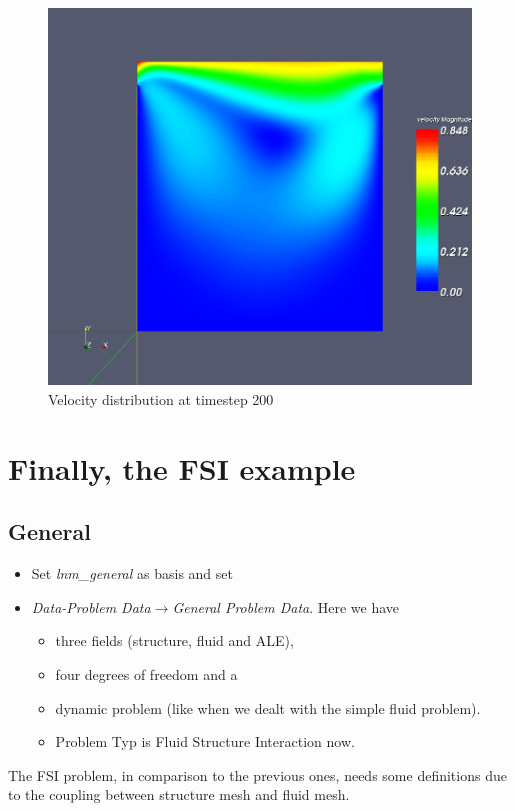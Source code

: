 %
\begin{figure}[h]
\includegraphics[scale=0.4]{Bilder/fluid_02}


\caption{\label{tut_fsi:4.2} Velocity distribution at timestep 200}
\end{figure}



\section{Finally, the FSI example}


\subsection{General}

\begin{itemize}
\item Set \emph{lnm\_general} as basis and set \emph{}
\item \emph{Data-Problem Data$\to$General Problem Data}. Here we have

\begin{itemize}
\item three fields (structure, fluid and ALE),
\item four degrees of freedom and a
\item dynamic problem (like when we dealt with the simple fluid problem).
\item Problem Typ is Fluid Structure Interaction now.
\end{itemize}
\end{itemize}
The FSI problem, in comparison to the previous ones, needs some
definitions due to the coupling between structure mesh and fluid mesh.

